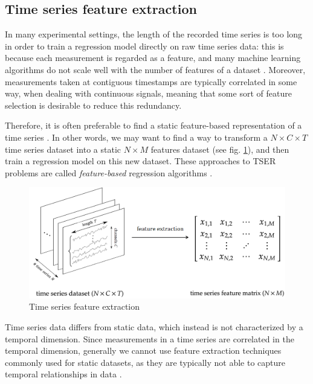 \subsection{Time series feature extraction}
In many experimental settings, the length of the recorded time series is too long in order to train a regression model directly on raw time series data: this is because each measurement is regarded as a feature, and many machine learning algorithms do not scale well with the number of features of a dataset \cite{ts_feat_extr}. Moreover, measurements taken at contiguous timestamps are typically correlated in some way, when dealing with continuous signals, meaning that some sort of feature selection is desirable to reduce this redundancy.

Therefore, it is often preferable to find a static feature-based representation of a time series \cite{ts_feat_extr}. In other words, we may want to find a way to transform a $N\times C\times T$ time series dataset into a static $N\times M$ features dataset (see fig. \ref{fig:ts_feat_extr}), and then train a regression model on this new dataset. These approaches to TSER problems are called \textit{feature-based} regression algorithms \cite{TSER}.

\begin{figure}[hbt!]
    \centering
    \includegraphics[width=\textwidth]{images/ts_feat_extr}
    \caption{Time series feature extraction}
    \label{fig:ts_feat_extr}
\end{figure}

Time series data differs from static data, which instead is not characterized by a temporal dimension. Since measurements in a time series are correlated in the temporal dimension, generally we cannot use feature extraction techniques commonly used for static datasets, as they are typically not able to capture temporal relationships in data \cite{ts_feat_extr}.

